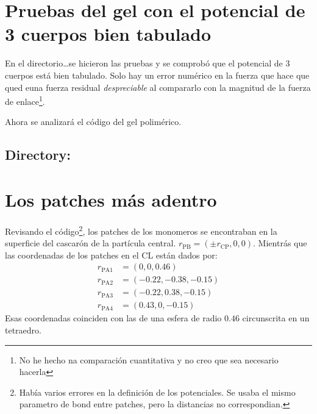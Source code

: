 \documentclass[../main.tex]{subfiles}
\begin{document}
\justifying

\section{Pruebas del gel con el potencial de 3 cuerpos bien tabulado}

En el directorio\ldots se hicieron las pruebas y se comprobó que el potencial de 3 cuerpos está bien tabulado.
Solo hay un error numérico en la fuerza que hace que qued euna fuerza residual \emph{despreciable} al compararlo con la magnitud de la fuerza de enlace\footnote{No he hecho na comparación cuantitativa y no creo que sea necesario hacerla}.

Ahora se analizará el código del gel polimérico.

\subsection{Directory: }

\newpage

\section{Los patches más adentro}

Revisando el código\footnote{Había varios errores en la definición de los potenciales.
Se usaba el mismo parametro de bond entre patches, pero la distancias no correspondian.
}, los patches de los monomeros se encontraban en la superficie del cascarón de la partícula central.
\(r_{\mathrm{PB}} = (\pm r_{\mathrm{CP}}, 0, 0)\).
Mientrás que las coordenadas de los patches en el CL están dados por:
\begin{align*}
    r_{\mathrm{PA}1} &= (0,0,0.46) \\
    r_{\mathrm{PA}2} &= (-0.22,-0.38,-0.15) \\
    r_{\mathrm{PA}3} &= (-0.22,0.38,-0.15) \\
    r_{\mathrm{PA}4} &= (0.43,0,-0.15)
\end{align*}
Esas coordenadas coinciden con las de una esfera de radio \(0.46\) circunscrita en un tetraedro.
\end{document}
